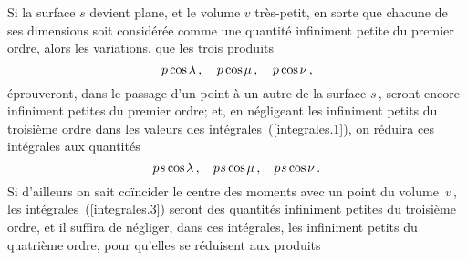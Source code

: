 \documentclass[11pt, twoside, leqno]{article}
\renewcommand{\eqref}[1]{(\ref{#1})}
\newcommand\cosine{\operatorname{cos} \hspace{-0.1ex}}
\begin{document}
Si la surface \;$s$\; devient plane, et le volume \;$v$\; très-petit, en sorte que chacune de ses dimensions soit considérée comme une quantité infiniment petite du premier ordre, alors les variations, que les trois produits
\begin{equation}
p \cosine \lambda \hspace{.4ex} \text{,} \hspace{1.2em}
p \cosine \mu \hspace{.4ex} \text{,} \hspace{1.2em}
p \cosine \nu \hspace{.4ex} \text{,}
\end{equation}
éprouveront, dans le passage d'un point à un autre de la surface \;$s$\,,\hspace{.5ex} seront encore infiniment petites du premier ordre; et, en négligeant les infiniment petits du troisième ordre dans les valeurs des intégrales~\eqref{integrales.1}, on réduira ces intégrales aux quantités
\begin{equation}\label{expression.6}
p \hspace{.1ex} s \cosine \lambda \hspace{.4ex} \text{,} \hspace{1.1em}
p \hspace{.1ex} s \cosine \mu \hspace{.4ex} \text{,} \hspace{1.1em}
p \hspace{.1ex} s \cosine \nu \hspace{.4ex} \text{.}
\end{equation}
Si d'ailleurs on sait coïncider le centre des moments avec un point du volume~\;$v$\,,\hspace{.5ex} les intégrales~\eqref{integrales.3} seront des quantités infiniment petites du troisième ordre, et il suffira de négliger, dans ces intégrales, les infiniment petits du quatrième ordre, pour qu'elles se réduisent aux produits
\end{document}
